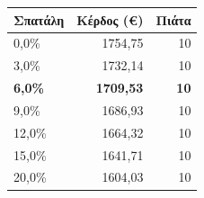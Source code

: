 \begin{tabular}{@{}lrr@{}}
\toprule
\textbf{Σπατάλη} & \textbf{Κέρδος (€)} & \textbf{Πιάτα} \\
\midrule
0,0\% & 1754,75 & 10 \\
3,0\% & 1732,14 & 10 \\
\bfseries 6,0\% & \bfseries 1709,53 & \bfseries 10 \\
9,0\% & 1686,93 & 10 \\
12,0\% & 1664,32 & 10 \\
15,0\% & 1641,71 & 10 \\
20,0\% & 1604,03 & 10 \\
\bottomrule
\end{tabular}
